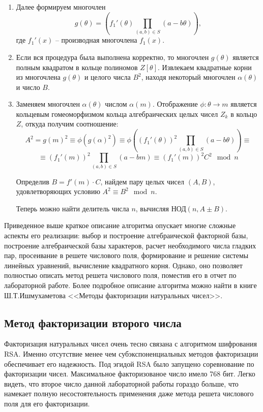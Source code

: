 \documentclass[a4paper,12pt]{article}
\begin{document}
\begin{enumerate}
    \item Далее формируем многочлен
    \begin{equation} \label{eq:eq_5}
        g(\theta) = (f_1'(\theta) \prod_{(a, b) \in S} (a - b\theta)),
    \end{equation}
    где $f_1'(x)$ -- производная многочлена $f_1(x)$.

    \item Если вся процедура была выполнена корректно, то многочлен
    $g(\theta)$ является полным квадратом в кольце полиномов $Z[\theta]$.
    Извлекаем квадратные корни из многочлена $g(\theta)$ и целого числа $B^2$,
    находя некоторый многочлен $\alpha(\theta)$ и число $B$.

    \item Заменяем многочлен $\alpha(\theta)$ числом $\alpha(m)$. Отображение
    $\phi : \theta \rightarrow m$ является кольцевым гомеоморфизмом кольца
    алгебраических целых чисел $Z_k$ в кольцо $Z$, откуда получим соотношение:
    \begin{equation} \label{eq:eq_6}
        A^2 = g(m)^2 \equiv \phi(g(\alpha)^2) \equiv
        \phi\left((f_1'(\theta))^2 \prod_{(a, b) \in S}(a - b\theta)\right) \equiv
    \end{equation}
    \begin{equation}
        \equiv (f_1'(m))^2 \prod_{(a, b) \in S}(a - bm) \equiv (f_1'(m))^2 C^2 \mod n
    \end{equation}

    Определив $B = f'(m) \cdot C$, найдем пару целых чисел $(A, B)$,
    удовлетворяющих условию $A^2 \equiv B^2 \mod n$.

    Теперь можно найти делитель числа $n$, вычисляя НОД$(n, A \pm B)$.
\end{enumerate}

Приведенное выше краткое описание алгоритма опускает многие сложные
аспекты его реализации: выбор и построение алгебраической факторной базы,
построение алгебраической базы характеров, расчет необходимого числа гладких
пар, просеивание в решете числового поля, формирование и решение системы линейных
уравнений, вычисление квадратного корня. Однако, оно позволяет полностью описать
метод решета числового поля, поместив его в отчет по лабораторной работе.
Более подробное описание алгоритма можно найти в книге Ш.Т.Ишмухаметова
<<Методы факторизации натуральных чисел>>.

\subsection{Метод факторизации второго числа}
Факторизация натуральных чисел очень тесно связана
с алгоритмом шифрования RSA. Именно отсутствие менее
чем субэкспоненциальных методов факторизации обеспечивает
его надежность. Под эгидой RSA было запущено соревнование
по факторизации чисел. Максимальное факторизованое число
имело 768 бит. Легко видеть, что второе число данной лабораторной работы
гораздо больше, что намекает полную несостоятельность применения
даже метода решета числового поля для его факторизации.
\end{document}
